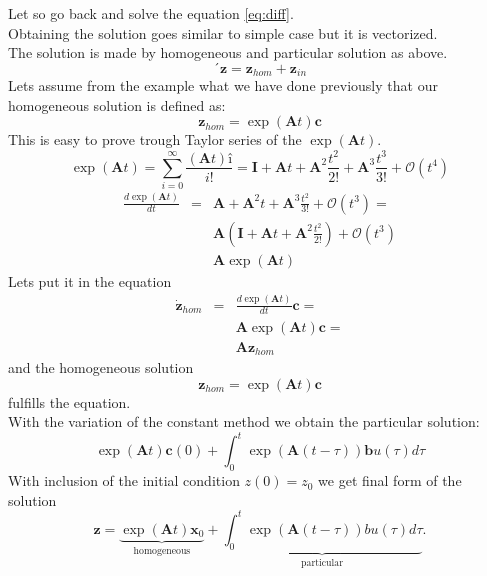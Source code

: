 Let so go back and solve the equation \ref{eq:diff}.\\
Obtaining the solution goes similar to simple case but it is vectorized.\\
The solution is made by homogeneous and particular solution as above.\\
\begin{equation}´
	\mathbf{z}=\mathbf{z}_{hom} + \mathbf{z}_{in}
\end{equation} 
Lets assume from the example what we have done previously that our homogeneous solution is defined as:
\begin{equation}
	\mathbf{z}_{hom}=\exp(\mathbf{A}t)\mathbf{c}
\end{equation}
This is easy to prove trough Taylor series of the $\exp(\mathbf{A}t)$.
\begin{equation}
	\exp(\mathbf{A}t) = \sum^{\infty}_{i=0}\frac{(\mathbf{A}t)î}{i!} = \mathbf{I}+ \mathbf{A}t+\mathbf{A}^2 \frac{t^2}{2!}+ \mathbf{A}^3 \frac{t^3}{3!} + \mathcal{O}(t^4)
\end{equation}
\begin{eqnarray}
	\frac{d\exp(\mathbf{A}t)}{dt} &=& \mathbf{A}+\mathbf{A}^2 t+ \mathbf{A}^3 \frac{t^2}{3!} + \mathcal{O}(t^3)=\\
	&&\mathbf{A}\left(\mathbf{I}+ \mathbf{A}t+\mathbf{A}^2 \frac{t^2}{2!}\right) + \mathcal{O}(t^3)\\
	&&\mathbf{A}\exp(\mathbf{A}t)
\end{eqnarray}
Lets put it in the equation
\begin{eqnarray}
	\dot{\mathbf{z}}_{hom}&=& \frac{d\exp(\mathbf{A}t)}{dt}\mathbf{c} =\\
	&&\mathbf{A}\exp(\mathbf{A}t)\mathbf{c} =\\
	&& \mathbf{A}\mathbf{z}_{hom}
\end{eqnarray}
and the homogeneous solution
\begin{equation}
	\boxed{
	\mathbf{z}_{hom} = \exp(\mathbf{A}t)\mathbf{c}}
\end{equation}
fulfills the equation.\\
With the variation of the constant method we obtain the particular solution:
\begin{equation}
\exp(\mathbf{A}t)\mathbf{c}(0)+ \int^t_0 \exp(\mathbf{A}(t-\tau))\mathbf{b}u(\tau)d\tau
\end{equation}
With inclusion of the initial condition $z(0) = z_0$ we get final form of the solution \\
\begin{equation}
	\boxed{\mathbf{z}= \underbrace{\exp(\mathbf{A}t)\mathbf{x}_0}_\text{homogeneous} + \underbrace{\int^t_0 \exp(\mathbf{A}(t-\tau))bu(\tau)d\tau}_\text{particular}}.
\end{equation}\\
